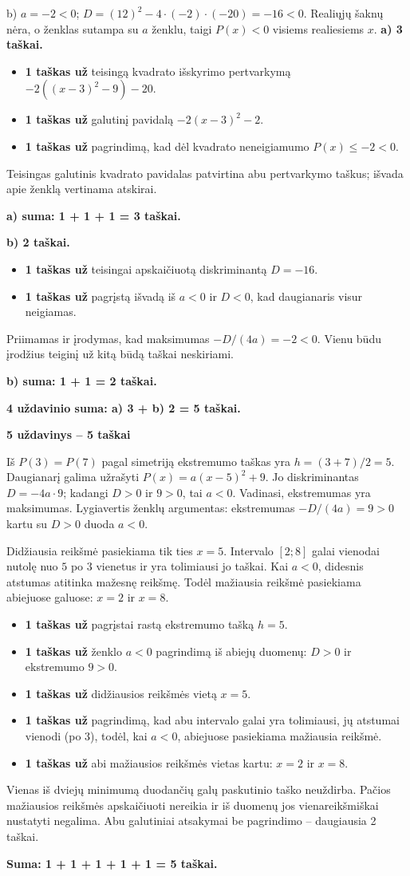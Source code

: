\documentclass[11pt]{article}
\newcommand{\sk}[1]{\par\medskip\textbf{#1}\par}
\begin{document}
b) $a=-2<0$; $D=(12)^2-4\cdot(-2)\cdot(-20)=-16<0$. Realiųjų šaknų nėra, o ženklas sutampa su $a$ ženklu, taigi $P(x)<0$ visiems realiesiems $x$.
\textbf{a) 3 taškai.}\begin{itemize}
\item \textbf{1 taškas už} teisingą kvadrato išskyrimo pertvarkymą $-2((x-3)^2-9)-20$.
\item \textbf{1 taškas už} galutinį pavidalą $-2(x-3)^2-2$.
\item \textbf{1 taškas už} pagrindimą, kad dėl kvadrato neneigiamumo $P(x)\le-2<0$.
\end{itemize}
Teisingas galutinis kvadrato pavidalas patvirtina abu pertvarkymo taškus; išvada apie ženklą vertinama atskirai.\par\textbf{a) suma: 1 + 1 + 1 = 3 taškai.}\par\textbf{b) 2 taškai.}\begin{itemize}
\item \textbf{1 taškas už} teisingai apskaičiuotą diskriminantą $D=-16$.
\item \textbf{1 taškas už} pagrįstą išvadą iš $a<0$ ir $D<0$, kad daugianaris visur neigiamas.
\end{itemize}
Priimamas ir įrodymas, kad maksimumas $-D/(4a)=-2<0$. Vienu būdu įrodžius teiginį už kitą būdą taškai neskiriami.\par\textbf{b) suma: 1 + 1 = 2 taškai.}\par\textbf{4 uždavinio suma: a) 3 + b) 2 = 5 taškai.}

\sk{5 uždavinys -- 5 taškai}
Iš $P(3)=P(7)$ pagal simetriją ekstremumo taškas yra $h=(3+7)/2=5$. Daugianarį galima užrašyti $P(x)=a(x-5)^2+9$. Jo diskriminantas $D=-4a\cdot9$; kadangi $D>0$ ir $9>0$, tai $a<0$. Vadinasi, ekstremumas yra maksimumas. Lygiavertis ženklų argumentas: ekstremumas $-D/(4a)=9>0$ kartu su $D>0$ duoda $a<0$.

Didžiausia reikšmė pasiekiama tik ties $x=5$. Intervalo $[2;8]$ galai vienodai nutolę nuo $5$ po $3$ vienetus ir yra tolimiausi jo taškai. Kai $a<0$, didesnis atstumas atitinka mažesnę reikšmę. Todėl mažiausia reikšmė pasiekiama abiejuose galuose: $x=2$ ir $x=8$.
\begin{itemize}
\item \textbf{1 taškas už} pagrįstai rastą ekstremumo tašką $h=5$.
\item \textbf{1 taškas už} ženklo $a<0$ pagrindimą iš abiejų duomenų: $D>0$ ir ekstremumo $9>0$.
\item \textbf{1 taškas už} didžiausios reikšmės vietą $x=5$.
\item \textbf{1 taškas už} pagrindimą, kad abu intervalo galai yra tolimiausi, jų atstumai vienodi (po 3), todėl, kai $a<0$, abiejuose pasiekiama mažiausia reikšmė.
\item \textbf{1 taškas už} abi mažiausios reikšmės vietas kartu: $x=2$ ir $x=8$.
\end{itemize}
Vienas iš dviejų minimumą duodančių galų paskutinio taško neuždirba. Pačios mažiausios reikšmės apskaičiuoti nereikia ir iš duomenų jos vienareikšmiškai nustatyti negalima. Abu galutiniai atsakymai be pagrindimo -- daugiausia 2 taškai.\par\textbf{Suma: 1 + 1 + 1 + 1 + 1 = 5 taškai.}\newpage
\end{document}
